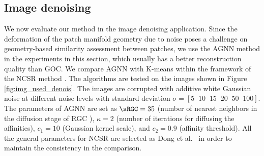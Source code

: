 \documentclass[journal]{IEEEtran}
\begin{document}




\subsection{Image denoising}
\label{ssec:exp_denoise}

We now evaluate our method in the image denoising application. Since the deformation of the patch manifold geometry due to noise poses a challenge on geometry-based similarity assessment between patches, we use the AGNN method in the experiments in this section, which usually has a better reconstruction quality than GOC. We compare AGNN with K-means within the framework of the NCSR method \cite{Dong13nonlocally}. The algorithms are tested on the images shown in Figure \ref{fig:img_used_denois}. The images are corrupted with additive white Gaussian noise at different noise levels with standard deviation $\sigma = \left[5\;\; 10\;\; 15\;\; 20 \;\; 50\;\; 100\right]$. The parameters of AGNN are set as  $\sRGC=35$ (number of nearest neighbors in the diffusion stage of RGC \cite{Donoser13replicator}), $\kappa=2$ (number of iterations for diffusing the affinities),  $c_1=10$ (Gaussian kernel scale), and $c_2=0.9$ (affinity threshold). All the general parameters for NCSR are selected as Dong et al.~\cite{Dong13nonlocally} in order to maintain the consistency in the comparison.
\end{document}

